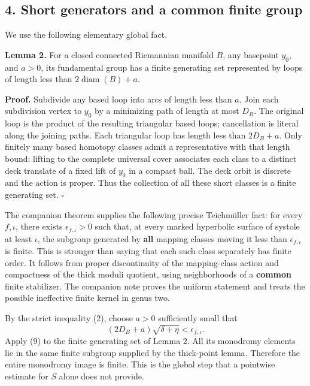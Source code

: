 \documentclass[
  11pt,
]{article}
\begin{document}
\hypertarget{short-generators-and-a-common-finite-group}{%
\subsection{4. Short generators and a common finite
group}\label{short-generators-and-a-common-finite-group}}

We use the following elementary global fact.

\textbf{Lemma 2.} For a closed connected Riemannian manifold \(B\), any
basepoint \(y_0\), and \(a>0\), its fundamental group has a finite
generating set represented by loops of length less than
\(2\operatorname{diam}(B)+a\).

\textbf{Proof.} Subdivide any based loop into arcs of length less than
\(a\). Join each subdivision vertex to \(y_0\) by a minimizing path of
length at most \(D_B\). The original loop is the product of the
resulting triangular based loops; cancellation is literal along the
joining paths. Each triangular loop has length less than \(2D_B+a\).
Only finitely many based homotopy classes admit a representative with
that length bound: lifting to the complete universal cover associates
each class to a distinct deck translate of a fixed lift of \(y_0\) in a
compact ball. The deck orbit is discrete and the action is proper. Thus
the collection of all these short classes is a finite generating set.
\(\square\)

The companion theorem supplies the following precise Teichmüller fact:
for every \(f,\iota\), there exists \(\epsilon_{f,\iota}>0\) such that,
at every marked hyperbolic surface of systole at least \(\iota\), the
subgroup generated by \textbf{all} mapping classes moving it less than
\(\epsilon_{f,\iota}\) is finite. This is stronger than saying that each
such class separately has finite order. It follows from proper
discontinuity of the mapping-class action and compactness of the thick
moduli quotient, using neighborhoods of a \textbf{common} finite
stabilizer. The companion note proves the uniform statement and treats
the possible ineffective finite kernel in genus two.

By the strict inequality (2), choose \(a>0\) sufficiently small that \[
              (2D_B+a)\sqrt{\delta+\eta}<\epsilon_{f,\iota}.
\] Apply (9) to the finite generating set of Lemma 2. All its monodromy
elements lie in the same finite subgroup supplied by the thick-point
lemma. Therefore the entire monodromy image is finite. This is the
global step that a pointwise estimate for \(S\) alone does not provide.
\end{document}
